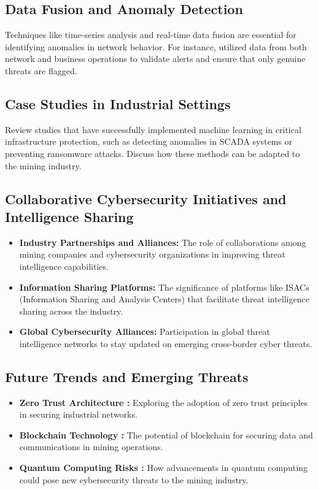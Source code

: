 \documentclass[a4paper,twoside,12pt]{report}
\begin{document}
\subsection*{Data Fusion and Anomaly Detection}
Techniques like time-series analysis and real-time data fusion \citet{song2022time} are essential for identifying anomalies in network behavior. For instance, \citet{islam2022smartvalidator} utilized data from both network and business operations to validate alerts and ensure that only genuine threats are flagged.

\subsection*{Case Studies in Industrial Settings}
Review studies that have successfully implemented machine learning in critical infrastructure protection, such as detecting anomalies in SCADA systems or preventing ransomware attacks. Discuss how these methods can be adapted to the mining industry.

\subsection*{Collaborative Cybersecurity Initiatives and Intelligence Sharing}
\begin{itemize}
    \item \textbf{Industry Partnerships and Alliances:} The role of collaborations among mining companies and cybersecurity organizations in improving threat intelligence capabilities.
    \item \textbf{Information Sharing Platforms:} The significance of platforms like ISACs (Information Sharing and Analysis Centers) that facilitate threat intelligence sharing across the industry.
    \item \textbf{Global Cybersecurity Alliances:} Participation in global threat intelligence networks to stay updated on emerging cross-border cyber threats.
\end{itemize}

\subsection*{Future Trends and Emerging Threats}
\begin{itemize}
    \item \textbf{Zero Trust Architecture \citet{stafford2020zero}:} Exploring the adoption of zero trust principles in securing industrial networks.
    \item \textbf{Blockchain Technology \citet{prakash2022blockchain}:} The potential of blockchain for securing data and communications in mining operations.
    \item \textbf{Quantum Computing Risks \citet{brooks2024inside}:} How advancements in quantum computing could pose new cybersecurity threats to the mining industry.
\end{itemize}
\end{document}
